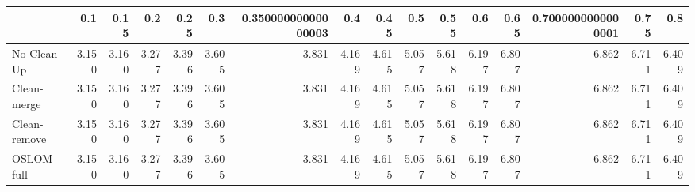 \begin{tabular}{lrrrrrrrrrrrrrrr}
\toprule
{} &   0.1 &  0.15 &   0.2 &  0.25 &   0.3 & 0.35000000000000003 &   0.4 &  0.45 &   0.5 &  0.55 &   0.6 &  0.65 & 0.7000000000000001 &  0.75 &   0.8 \\
\midrule
No Clean Up  & 3.150 & 3.160 & 3.277 & 3.396 & 3.605 &               3.831 & 4.169 & 4.615 & 5.057 & 5.618 & 6.197 & 6.807 &              6.862 & 6.711 & 6.409 \\
Clean-merge  & 3.150 & 3.160 & 3.277 & 3.396 & 3.605 &               3.831 & 4.169 & 4.615 & 5.057 & 5.618 & 6.197 & 6.807 &              6.862 & 6.711 & 6.409 \\
Clean-remove & 3.150 & 3.160 & 3.277 & 3.396 & 3.605 &               3.831 & 4.169 & 4.615 & 5.057 & 5.618 & 6.197 & 6.807 &              6.862 & 6.711 & 6.409 \\
OSLOM-full   & 3.150 & 3.160 & 3.277 & 3.396 & 3.605 &               3.831 & 4.169 & 4.615 & 5.057 & 5.618 & 6.197 & 6.807 &              6.862 & 6.711 & 6.409 \\
\bottomrule
\end{tabular}
